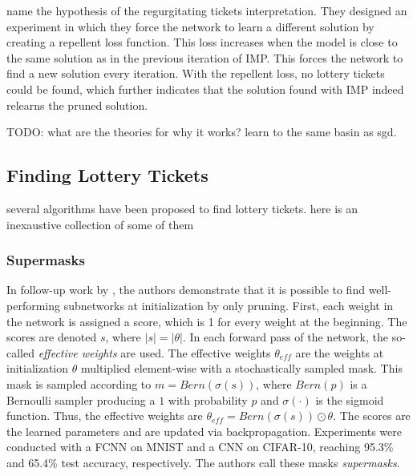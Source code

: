 \textcite{maene_towards_2021} name the hypothesis of \autocite{WhyLotteryTicketsWin} the regurgitating tickets interpretation.
They designed an experiment in which they force the network to learn a different solution by creating a repellent loss function.
This loss increases when the model is close to the same solution as in the previous iteration of IMP.
This forces the network to find a new solution every iteration.
With the repellent loss, no lottery tickets could be found, which further indicates that the solution found with IMP indeed relearns the pruned solution.

TODO: what are the theories for why it works? learn to the same basin as sgd.

\subsection{Finding Lottery Tickets}
several algorithms have been proposed to find lottery tickets. here is an inexaustive collection of some of them 

\subsubsection{Supermasks}
In follow-up work by \textcite{DBLP:conf/nips/ZhouLLY19}, the authors demonstrate that it is possible to find well-performing subnetworks at initialization by only pruning.
First, each weight in the network is assigned a score, which is 1 for every weight at the beginning. 
The scores are denoted $s$, where $|s| = |\theta|$.
In each forward pass of the network, the so-called \textit{effective weights} are used.
The effective weights $\theta_{eff}$ are the weights at initialization $\theta$ multiplied element-wise with a stochastically sampled mask.
This mask is sampled according to $m = \textit{Bern}(\sigma(s))$, where $\textit{Bern}(p)$ is a Bernoulli sampler producing a $1$ with probability $p$ and $\sigma(\cdot)$ is the sigmoid function. 
Thus, the effective weights are $\theta_{eff} = \textit{Bern}(\sigma(s)) \odot \theta$.
The scores are the learned parameters and are updated via backpropagation.
Experiments were conducted with a FCNN on MNIST and a CNN on CIFAR-10, reaching 95.3\% and 65.4\% test accuracy, respectively.
The authors call these masks \textit{supermasks}.

